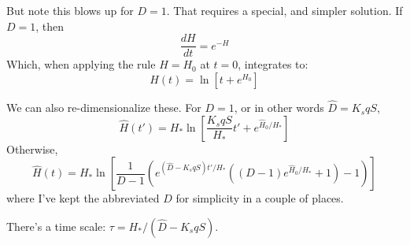 \documentclass[11pt]{amsart}
\begin{document}
But note this blows up for $D=1$. That requires a special, and simpler solution. If $D=1$, then
\begin{equation}
\frac{dH}{dt} = e^{-H}
\end{equation}
Which, when applying the rule $H=H_0$ at $t=0$, integrates to:
\begin{equation}
H(t) = \ln \left[ t + e^{H_0} \right]
\end{equation}

We can also re-dimensionalize these. For $D=1$, or in other words $\hat{D} = K_sqS$, 
\begin{equation}
\hat{H}(t') = H_* \ln \left[ \frac{K_sqS}{H_*} t' + e^{\hat{H}_0/H_*} \right]
\end{equation}
Otherwise,
\begin{equation}
\hat{H}(t) = H_* \ln \left[ \frac{1}{D-1} \left( e^{(\hat{D}-K_s q S)t' / H_*} \left( (D-1) e^{\hat{H}_0/H_*}  + 1 \right) - 1 \right) \right]
\end{equation}
where I've kept the abbreviated $D$ for simplicity in a couple of places.

There's a time scale: $\tau = H_* / (\hat{D}-K_sqS)$.

\end{document}
